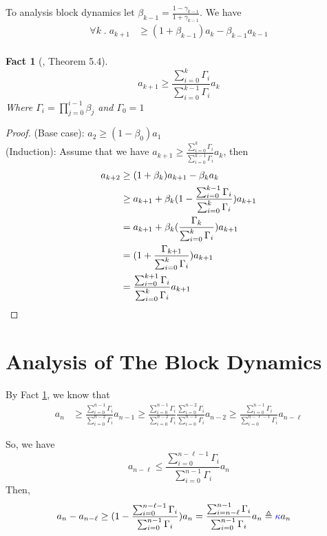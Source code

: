 \documentclass{article}
\newtheorem{fact}{Fact}[section]
\begin{document}
To analysis block dynamics let $\beta_{k-1} = \frac{1 - \gamma_{k-1}}{1 + \gamma_{k-1}}$.
We have
\begin{align*}
  \forall k \;.\; a_{k+1} &\geq (1 + \beta_{k-1})a_k - \beta_{k-1}a_{k-1} \\
\end{align*}

\begin{fact}[\cite{CLV20-1}, Theorem 5.4] \label{fact:decay}
  \[a_{k+1} \geq \frac{\sum_{i=0}^k \Gamma_i}{\sum_{i=0}^{k-1}\Gamma_i} a_k\]
  Where $\Gamma_i = \prod_{j=0}^{i-1} \beta_j$ and $\Gamma_0 = 1$
\end{fact}
\begin{proof}
  (Base case): $a_2 \geq (1 - \beta_0) a_1$ \\
  (Induction): Assume that we have $a_{k+1} \geq \frac{\sum_{i=0}^k \Gamma_i}{\sum_{i=0}^{k-1}\Gamma_i} a_k$, then
  \begin{align*}
    a_{k+2}
    &\geq (1 + \beta_k)a_{k+1} - \beta_ka_k \\
    &\geq a_{k+1} + \beta_k(1 - \frac{\sum_{i=0}^{k-1}\Gamma_i}{\sum_{i=0}^{k}\Gamma_i})a_{k+1} \\
    &= a_{k+1} + \beta_k(\frac{\Gamma_k}{\sum_{i=0}^{k}\Gamma_i})a_{k+1} \\
    &= (1 + \frac{\Gamma_{k+1}}{\sum_{i=0}^k \Gamma_i})a_{k+1} \\
    &= \frac{\sum_{i=0}^{k+1}\Gamma_i}{\sum_{i=0}^k\Gamma_i}a_{k+1} \qedhere
  \end{align*}
\end{proof}

\section{Analysis of The Block Dynamics \cite{CLV20-1}}

By Fact \ref{fact:decay}, we know that
\begin{align*}
  a_n
  &\geq \frac{\sum_{i=0}^{n-1}\Gamma_i}{\sum_{i=0}^{n-2}\Gamma_i} a_{n-1} 
  \geq \frac{\sum_{i=0}^{n-1}\Gamma_i}{\sum_{i=0}^{n-2}\Gamma_i} \frac{\sum_{i=0}^{n-2}\Gamma_i}{\sum_{i=0}^{n-3}\Gamma_i} a_{n-2} 
  \geq \frac{\sum_{i=0}^{n-1}\Gamma_i}{\sum_{i=0}^{n-\ell-1}\Gamma_i} a_{n-\ell}
\end{align*}

So, we have
\[a_{n-\ell} \leq \frac{\sum_{i=0}^{n-\ell-1}\Gamma_i}{\sum_{i=0}^{n-1}\Gamma_i}a_n \]
Then,
\begin{align*}
  a_n - a_{n-\ell} &\geq (1 - \frac{\sum_{i=0}^{n-\ell-1}\Gamma_i}{\sum_{i=0}^{n-1}\Gamma_i})a_n 
  = \frac{\sum_{i=n-\ell}^{n-1}\Gamma_i}{\sum_{i=0}^{n-1}\Gamma_i} a_n\triangleq \textcolor{blue}{\kappa} a_n
\end{align*}
\end{document}

